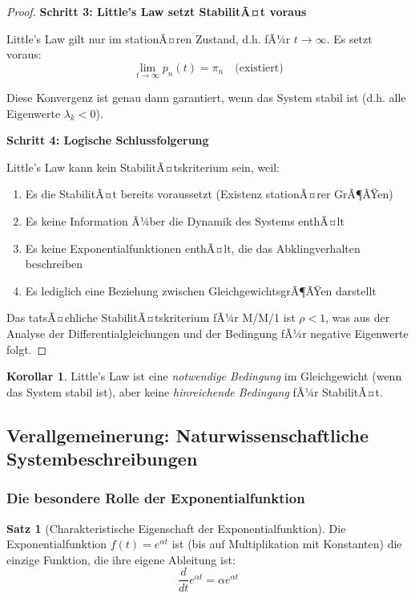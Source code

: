 ﻿\documentclass[a4paper,12pt]{scrreprt}
\theoremstyle{definition}
\newtheorem{satz}{Satz}[section]
\newtheorem{korollar}{Korollar}[section]
\begin{document}
\begin{proof}
	\textbf{Schritt 3: Little's Law setzt StabilitÃ¤t voraus}
	
	Little's Law gilt nur im stationÃ¤ren Zustand, d.h. fÃ¼r $t \to \infty$. Es setzt voraus:
	\begin{equation}
		\lim_{t \to \infty} p_n(t) = \pi_n \quad \text{(existiert)}
	\end{equation}
	
	Diese Konvergenz ist genau dann garantiert, wenn das System stabil ist (d.h. alle Eigenwerte $\lambda_k < 0$). 
	
	\textbf{Schritt 4: Logische Schlussfolgerung}
	
	Little's Law kann kein StabilitÃ¤tskriterium sein, weil:
	\begin{enumerate}
		\item[-] Es die StabilitÃ¤t bereits voraussetzt (Existenz stationÃ¤rer GrÃ¶ÃŸen)
		\item[-] Es keine Information Ã¼ber die Dynamik des Systems enthÃ¤lt
		\item[-] Es keine Exponentialfunktionen enthÃ¤lt, die das Abklingverhalten beschreiben
		\item[-] Es lediglich eine Beziehung zwischen GleichgewichtsgrÃ¶ÃŸen darstellt
	\end{enumerate}
	
	Das tatsÃ¤chliche StabilitÃ¤tskriterium fÃ¼r M/M/1 ist $\rho < 1$, was aus der Analyse der Differentialgleichungen und der Bedingung fÃ¼r negative Eigenwerte folgt.
\end{proof}

\begin{korollar}
	Little's Law ist eine \textit{notwendige Bedingung} im Gleichgewicht (wenn das System stabil ist), aber keine \textit{hinreichende Bedingung} fÃ¼r StabilitÃ¤t.
\end{korollar}

\subsection{Verallgemeinerung: Naturwissenschaftliche Systembeschreibungen}

\subsubsection{Die besondere Rolle der Exponentialfunktion}

\begin{satz}[Charakteristische Eigenschaft der Exponentialfunktion]
	Die Exponentialfunktion $f(t) = e^{\alpha t}$ ist (bis auf Multiplikation mit Konstanten) die einzige Funktion, die ihre eigene Ableitung ist:
	\begin{equation}
		\frac{d}{dt} e^{\alpha t} = \alpha e^{\alpha t}
	\end{equation}
\end{satz}
\end{document}
